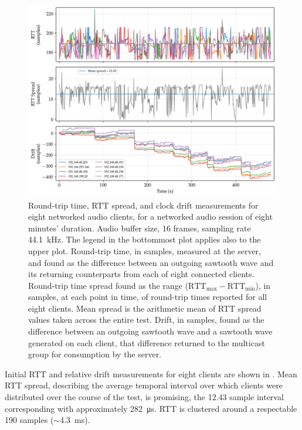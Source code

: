 \begin{figure}[h]
    \centering
    \includegraphics[width=\textwidth]{figures/rtt_drift_16}
    \caption{
        Round-trip time, RTT spread, and clock drift measurements for eight
        networked audio clients, for a networked audio session of eight minutes'
        duration.
        Audio buffer size, 16 frames, sampling rate \qty{44.1}{\kHz}.
        The legend in the bottommost plot applies also to the upper plot.
        Round-trip time, in samples, measured at the server, and found as the
        difference between an outgoing sawtooth wave and its returning
        counterparts from each of eight connected clients.
        Round-trip time spread found as the range ($\text{RTT}_{\max} -
        \text{RTT}_{\min}$), in samples, at each point in time, of
        round-trip times reported for all eight clients.
        Mean spread is the arithmetic mean of RTT spread values taken across
        the entire test.
        Drift, in samples, found as the difference between an outgoing sawtooth
        wave and a sawtooth wave generated on each client, that difference
        returned to the multicast group for consumption by the server.
    }
    \label{fig:rtt-drift-16}
\end{figure}

Initial RTT and relative drift measurements for eight clients are shown in
.
Mean RTT spread, describing the average temporal interval over which clients
were distributed over the course of the test, is promising, the 12.43 sample
interval corresponding with approximately \qty{282}{\us}.
RTT is clustered around a respectable 190 samples ($\sim$\qty{4.3}{\ms}).

